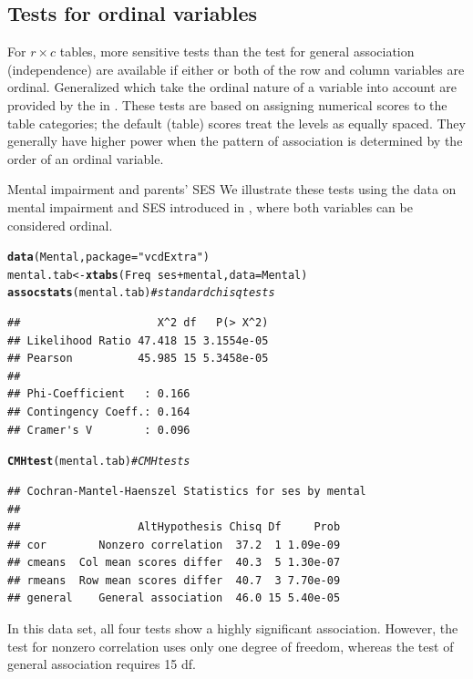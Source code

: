 \documentclass[11pt]{book}\usepackage[]{graphicx}\usepackage[]{color}
\makeatletter
\newcommand{\hlstr}[1]{\textcolor[rgb]{0.192,0.494,0.8}{#1}}%
\newcommand{\hlcom}[1]{\textcolor[rgb]{0.678,0.584,0.686}{\textit{#1}}}%
\newcommand{\hlopt}[1]{\textcolor[rgb]{0,0,0}{#1}}%
\newcommand{\hlstd}[1]{\textcolor[rgb]{0.345,0.345,0.345}{#1}}%
\newcommand{\hlkwb}[1]{\textcolor[rgb]{0.69,0.353,0.396}{#1}}%
\newcommand{\hlkwc}[1]{\textcolor[rgb]{0.333,0.667,0.333}{#1}}%
\newcommand{\hlkwd}[1]{\textcolor[rgb]{0.737,0.353,0.396}{\textbf{#1}}}%
\newenvironment{kframe}{%
 \def\at@end@of@kframe{}%
 \ifinner\ifhmode%
  \def\at@end@of@kframe{\end{minipage}}%
  \begin{minipage}{\columnwidth}%
 \fi\fi%
 \def\FrameCommand##1{\hskip\@totalleftmargin \hskip-\fboxsep
 \colorbox{shadecolor}{##1}\hskip-\fboxsep
     \hskip-\linewidth \hskip-\@totalleftmargin \hskip\columnwidth}%
 \MakeFramed {\advance\hsize-\width
   \@totalleftmargin\z@ \linewidth\hsize
   \@setminipage}}%
 {\par\unskip\endMakeFramed%
 \at@end@of@kframe}
\newenvironment{knitrout}{}{} %
\renewenvironment{knitrout}{\small\renewcommand{\baselinestretch}{.85}}{} %
\makeatother
\begin{document}
\subsection{Tests for ordinal variables}\label{sec:ordinaltests}

For \(r \times  c\) tables, more sensitive tests 
than the test for general association (independence)
are available if
either or both of the row and column variables are
ordinal. Generalized  
\citep{Landis-etal:1978}
which take the ordinal nature of a variable into
account are provided by the  in .
These tests are based on assigning numerical scores to
the table categories;  the default (table) scores treat the levels as
equally spaced.  They generally have higher power when the pattern of
association is determined by the order of an ordinal variable.

\begin{Example}[mental2]{Mental impairment and parents' SES}
We illustrate these tests using the data on mental impairment and SES
introduced in , where both variables can be considered ordinal.
\begin{knitrout}
\color{fgcolor}\begin{kframe}
\begin{alltt}
\hlkwd{data}\hlstd{(Mental,} \hlkwc{package}\hlstd{=}\hlstr{"vcdExtra"}\hlstd{)}
\hlstd{mental.tab} \hlkwb{<-} \hlkwd{xtabs}\hlstd{(Freq} \hlopt{~} \hlstd{ses} \hlopt{+} \hlstd{mental,} \hlkwc{data}\hlstd{=Mental)}
\hlkwd{assocstats}\hlstd{(mental.tab)}    \hlcom{# standard chisq tests}
\end{alltt}
\begin{verbatim}
##                     X^2 df   P(> X^2)
## Likelihood Ratio 47.418 15 3.1554e-05
## Pearson          45.985 15 5.3458e-05
## 
## Phi-Coefficient   : 0.166 
## Contingency Coeff.: 0.164 
## Cramer's V        : 0.096
\end{verbatim}
\begin{alltt}
\hlkwd{CMHtest}\hlstd{(mental.tab)}       \hlcom{# CMH tests}
\end{alltt}
\begin{verbatim}
## Cochran-Mantel-Haenszel Statistics for ses by mental 
## 
##                  AltHypothesis Chisq Df     Prob
## cor        Nonzero correlation  37.2  1 1.09e-09
## cmeans  Col mean scores differ  40.3  5 1.30e-07
## rmeans  Row mean scores differ  40.7  3 7.70e-09
## general    General association  46.0 15 5.40e-05
\end{verbatim}
\end{kframe}
\end{knitrout}

In this data set, all four tests show a highly significant association.
However, the  test for nonzero correlation uses only one 
degree of freedom, whereas the test of general association requires
15 df.
\end{Example}
\end{document}
